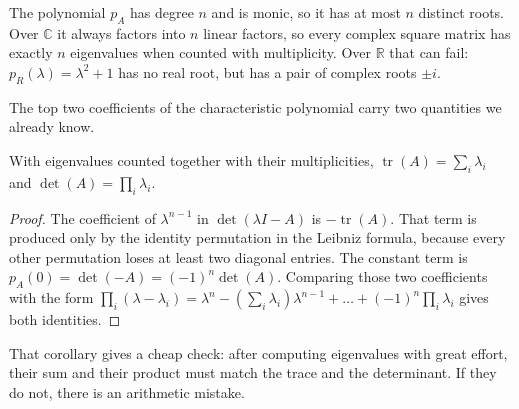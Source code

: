 The polynomial $p_{A}$ has degree $n$ and is monic, so it has at most $n$ distinct roots. Over
$\mathbb{C}$ it always factors into $n$ linear factors, so every complex square matrix has exactly
$n$ eigenvalues when counted with multiplicity. Over $\mathbb{R}$ that can fail:
$p_{R}(\lambda)=\lambda^{2}+1$ has no real root, but has a pair of complex roots $\pm i$.

The top two coefficients of the characteristic polynomial carry two quantities we already know.

\begin{akibat}
With eigenvalues counted together with their multiplicities,
$\operatorname{tr}(A)=\sum_{i}\lambda_{i}$ and $\det(A)=\prod_{i}\lambda_{i}$.
\end{akibat}

\begin{proof}
The coefficient of $\lambda^{n-1}$ in $\det(\lambda I-A)$ is $-\operatorname{tr}(A)$. That term is
produced only by the identity permutation in the Leibniz formula, because every other permutation
loses at least two diagonal entries. The constant term is
$p_{A}(0)=\det(-A)=(-1)^{n}\det(A)$. Comparing those two coefficients with the form
$\prod_{i}(\lambda-\lambda_{i})=\lambda^{n}-(\sum_{i}\lambda_{i})\lambda^{n-1}+\dots+(-1)^{n}
\prod_{i}\lambda_{i}$ gives both identities.
\end{proof}

That corollary gives a cheap check: after computing eigenvalues with great effort, their sum and
their product must match the trace and the determinant. If they do not, there is an arithmetic
mistake.

